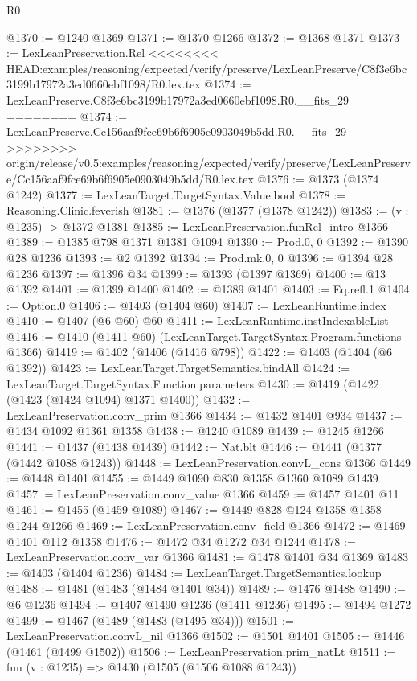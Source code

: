 \begin{lexlean}{R0}
\begin{coremodule}
{{{{{{{{{{{{{{{{{{{{{{{{{{{{{{{{{{{{{{{{{{{{{{{{{{{{{{{{{{{{{{{{{{{{{{{{{{{{{{{{{{{{{{@1370 := @1240 @1369
@1371 := @1370 @1266
@1372 := @1368 @1371
@1373 := LexLeanPreservation.Rel
<<<<<<<< HEAD:examples/reasoning/expected/verify/preserve/LexLeanPreserve/C8f3e6bc3199b17972a3ed0660ebf1098/R0.lex.tex
@1374 := LexLeanPreserve.C8f3e6bc3199b17972a3ed0660ebf1098.R0.__fits_29
========
@1374 := LexLeanPreserve.Cc156aaf9fce69b6f6905e0903049b5dd.R0.__fits_29
>>>>>>>> origin/release/v0.5:examples/reasoning/expected/verify/preserve/LexLeanPreserve/Cc156aaf9fce69b6f6905e0903049b5dd/R0.lex.tex
@1376 := @1373 (@1374 @1242)
@1377 := LexLeanTarget.TargetSyntax.Value.bool
@1378 := Reasoning.Clinic.feverish
@1381 := @1376 (@1377 (@1378 @1242))
@1383 := (v : @1235) -> @1372 @1381
@1385 := LexLeanPreservation.funRel_intro @1366
@1389 := @1385 @798 @1371 @1381 @1094
@1390 := Prod.{0, 0}
@1392 := @1390 @28 @1236
@1393 := @2 @1392
@1394 := Prod.mk.{0, 0}
@1396 := @1394 @28 @1236
@1397 := @1396 @34
@1399 := @1393 (@1397 @1369)
@1400 := @13 @1392
@1401 := @1399 @1400
@1402 := @1389 @1401
@1403 := Eq.refl.{1}
@1404 := Option.{0}
@1406 := @1403 (@1404 @60)
@1407 := LexLeanRuntime.index
@1410 := @1407 (@6 @60) @60
@1411 := LexLeanRuntime.instIndexableList
@1416 := @1410 (@1411 @60) (LexLeanTarget.TargetSyntax.Program.functions @1366)
@1419 := @1402 (@1406 (@1416 @798))
@1422 := @1403 (@1404 (@6 @1392))
@1423 := LexLeanTarget.TargetSemantics.bindAll
@1424 := LexLeanTarget.TargetSyntax.Function.parameters
@1430 := @1419 (@1422 (@1423 (@1424 @1094) @1371 @1400))
@1432 := LexLeanPreservation.conv_prim @1366
@1434 := @1432 @1401 @934
@1437 := @1434 @1092 @1361 @1358
@1438 := @1240 @1089
@1439 := @1245 @1266
@1441 := @1437 (@1438 @1439)
@1442 := Nat.blt
@1446 := @1441 (@1377 (@1442 @1088 @1243))
@1448 := LexLeanPreservation.convL_cons @1366
@1449 := @1448 @1401
@1455 := @1449 @1090 @830 @1358 @1360 @1089 @1439
@1457 := LexLeanPreservation.conv_value @1366
@1459 := @1457 @1401 @11
@1461 := @1455 (@1459 @1089)
@1467 := @1449 @828 @124 @1358 @1358 @1244 @1266
@1469 := LexLeanPreservation.conv_field @1366
@1472 := @1469 @1401 @112 @1358
@1476 := @1472 @34 @1272 @34 @1244
@1478 := LexLeanPreservation.conv_var @1366
@1481 := @1478 @1401 @34 @1369
@1483 := @1403 (@1404 @1236)
@1484 := LexLeanTarget.TargetSemantics.lookup
@1488 := @1481 (@1483 (@1484 @1401 @34))
@1489 := @1476 @1488
@1490 := @6 @1236
@1494 := @1407 @1490 @1236 (@1411 @1236)
@1495 := @1494 @1272
@1499 := @1467 (@1489 (@1483 (@1495 @34)))
@1501 := LexLeanPreservation.convL_nil @1366
@1502 := @1501 @1401
@1505 := @1446 (@1461 (@1499 @1502))
@1506 := LexLeanPreservation.prim_natLt
@1511 := fun (v : @1235) => @1430 (@1505 (@1506 @1088 @1243))
}}}}}}}}}}}}}}}}}}}}}}}}}}}}}}}}}}}}}}}}}}}}}}}}}}}}}}}}}}}}}}}}}}}}}}}}}}}}}}}}}}}}}}
\end{coremodule}
\end{lexlean}
